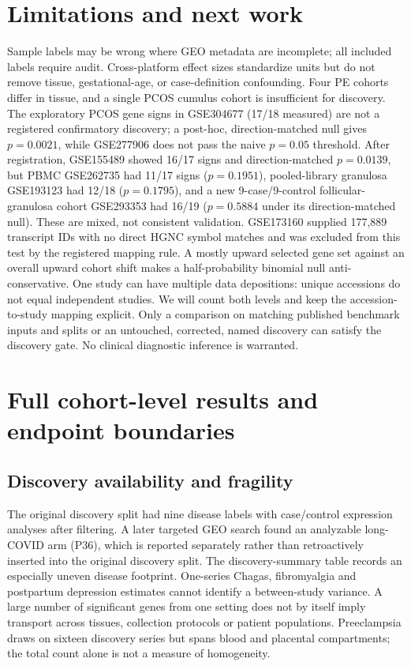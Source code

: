 \documentclass[11pt,a4paper]{article}
\begin{document}
\section{Limitations and next work}
Sample labels may be wrong where GEO metadata are incomplete; all included labels require audit. Cross-platform effect sizes standardize units but do not remove tissue, gestational-age, or case-definition confounding. Four PE cohorts differ in tissue, and a single PCOS cumulus cohort is insufficient for discovery. The exploratory PCOS gene signs in GSE304677 (17/18 measured) are not a registered confirmatory discovery; a post-hoc, direction-matched null gives $p=0.0021$, while GSE277906 does not pass the naive $p=0.05$ threshold. After registration, GSE155489 showed 16/17 signs and direction-matched $p=0.0139$, but PBMC GSE262735 had 11/17 signs ($p=0.1951$), pooled-library granulosa GSE193123 had 12/18 ($p=0.1795$), and a new 9-case/9-control follicular-granulosa cohort GSE293353 had 16/19 ($p=0.5884$ under its direction-matched null). These are mixed, not consistent validation. GSE173160 supplied 177,889 transcript IDs with no direct HGNC symbol matches and was excluded from this test by the registered mapping rule. A mostly upward selected gene set against an overall upward cohort shift makes a half-probability binomial null anti-conservative. One study can have multiple data depositions: unique accessions do not equal independent studies. We will count both levels and keep the accession-to-study mapping explicit. Only a comparison on matching published benchmark inputs and splits or an untouched, corrected, named discovery can satisfy the discovery gate. No clinical diagnostic inference is warranted.

\section{Full cohort-level results and endpoint boundaries}
\subsection{Discovery availability and fragility}
The original discovery split had nine disease labels with case/control expression analyses after filtering. A later targeted GEO search found an analyzable long-COVID arm (P36), which is reported separately rather than retroactively inserted into the original discovery split. The discovery-summary table records an especially uneven disease footprint. One-series Chagas, fibromyalgia and postpartum depression estimates cannot identify a between-study variance. A large number of significant genes from one setting does not by itself imply transport across tissues, collection protocols or patient populations. Preeclampsia draws on sixteen discovery series but spans blood and placental compartments; the total count alone is not a measure of homogeneity.
\end{document}
